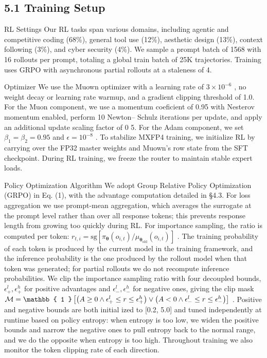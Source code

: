 \documentclass[
  10
]{article}
\begin{document}
\subsection{5.1 Training Setup}\label{training-setup}

RL Settings Our RL tasks span various domains, including agentic and
competitive coding (68\%), general tool use (12\%), aesthetic design
(13\%), context following (3\%), and cyber security (4\%). We sample a
prompt batch of 1568 with 16 rollouts per prompt, totaling a global
train batch of 25K trajectories. Training uses GRPO with asynchronous
partial rollouts at a staleness of 4.

Optimizer We use the Muown optimizer with a learning rate of
\(3 \times 1 0 ^ { - 6 }\) , no weight decay or learning rate warmup,
and a gradient clipping threshold of 1.0. For the Muon component, we use
a momentum coeficient of 0.95 with Nesterov momentum enabled, perform 10
Newton-- Schulz iterations per update, and apply an additional update
scaling factor of 0 5. For the Adam component, we set
\(\beta _ { 1 } = \beta _ { 2 } = 0 . 9 5\) and
\(\epsilon = 1 0 ^ { - 8 }\) . To stabilize MXFP4 training, we
initialize RL by carrying over the FP32 master weights and Muown's row
state from the SFT checkpoint. During RL training, we freeze the router
to maintain stable expert loads.

Policy Optimization Algorithm We adopt Group Relative Policy
Optimization (GRPO) in Eq. (1), with the advantage computation detailed
in §4.3. For loss aggregation we use prompt-mean aggregation, which
averages the surrogate at the prompt level rather than over all response
tokens; this prevents response length from growing too quickly during
RL. For importance sampling, the ratio is computed per token:
\(r _ { t , i } = \mathrm { s g } [ \pi _ { \boldsymbol { \theta } } ( o _ { i , t } ) / \mu _ { \boldsymbol { \theta } _ { \mathrm { o l d } } } ( o _ { i , t } ) ]\)
. The training probability of each token is produced by the current
model in the training framework, and the inference probability is the
one produced by the rollout model when that token was generated; for
partial rollouts we do not recompute inference probabilities. We clip
the importance sampling ratio with four decoupled bounds,
\(\epsilon _ { + } ^ { l } , \epsilon _ { + } ^ { h }\) for positive
advantages and \(\epsilon _ { - } ^ { l } , \epsilon _ { - } ^ { h }\)
for negative ones, giving the clip mask
\({ \cal M } = \mathbb { 1 } \left[ \big ( A \ge 0 \land \epsilon _ { + } ^ { l } \le r \le \epsilon _ { + } ^ { h } \big ) \lor \big ( A < 0 \land \epsilon _ { - } ^ { l } \le r \le \epsilon _ { - } ^ { h } \big ) \right]\)
. Positive and negative bounds are both initial ized to {[}0.2, 5.0{]}
and tuned independently at runtime based on policy entropy: when entropy
is too low, we widen the positive bounds and narrow the negative ones to
pull entropy back to the normal range, and we do the opposite when
entropy is too high. Throughout training we also monitor the token
clipping rate of each direction.
\end{document}
